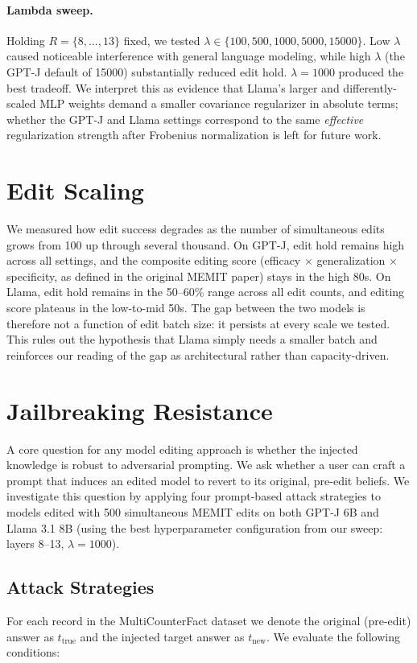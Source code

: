 \documentclass[11pt]{article}
\begin{document}
\paragraph{Lambda sweep.}
Holding $R = \{8, \dots, 13\}$ fixed, we tested $\lambda \in \{100, 500, 1000, 5000, 15000\}$. Low $\lambda$ caused noticeable interference with general language modeling, while high $\lambda$ (the GPT-J default of 15000) substantially reduced edit hold. $\lambda = 1000$ produced the best tradeoff. We interpret this as evidence that Llama's larger and differently-scaled MLP weights demand a smaller covariance regularizer in absolute terms; whether the GPT-J and Llama settings correspond to the same \emph{effective} regularization strength after Frobenius normalization is left for future work.

\section{Edit Scaling}
\label{sec:scaling}
We measured how edit success degrades as the number of simultaneous edits grows from 100 up through several thousand. On GPT-J, edit hold remains high across all settings, and the composite editing score (efficacy $\times$ generalization $\times$ specificity, as defined in the original MEMIT paper) stays in the high 80s. On Llama, edit hold remains in the 50--60\% range across all edit counts, and editing score plateaus in the low-to-mid 50s. The gap between the two models is therefore not a function of edit batch size: it persists at every scale we tested. This rules out the hypothesis that Llama simply needs a smaller batch and reinforces our reading of the gap as architectural rather than capacity-driven.

\section{Jailbreaking Resistance}
\label{sec:jailbreak}
A core question for any model editing approach is whether the injected knowledge is robust to adversarial prompting. We ask whether a user can craft a prompt that induces an edited model to revert to its original, pre-edit beliefs. We investigate this question by applying four prompt-based attack strategies to models edited with 500 simultaneous MEMIT edits on both GPT-J 6B and Llama 3.1 8B (using the best hyperparameter configuration from our sweep: layers 8--13, $\lambda=1000$).

\subsection{Attack Strategies}
For each record in the MultiCounterFact dataset we denote the original (pre-edit) answer as $t_{\text{true}}$ and the injected target answer as $t_{\text{new}}$. We evaluate the following conditions:
\end{document}

